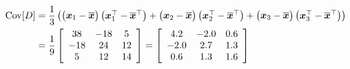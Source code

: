 \documentclass[12pt,twoside]{article}
\begin{document}
\begin{align}
    \operatorname{Cov}[D] &= \frac{1}{3} 
        \begin{pmatrix}
            \begin{pmatrix} {\boldsymbol{{x}}}_1 - \overline{{\boldsymbol{{x}}}} \end{pmatrix} 
            \begin{pmatrix} {\boldsymbol{{x}}}_1^\top - \overline{{\boldsymbol{{x}}}}^\top \end{pmatrix} +
            \begin{pmatrix} {\boldsymbol{{x}}}_2 - \overline{{\boldsymbol{{x}}}} \end{pmatrix}
            \begin{pmatrix} {\boldsymbol{{x}}}_2^\top - \overline{{\boldsymbol{{x}}}}^\top \end{pmatrix} +
            \begin{pmatrix} {\boldsymbol{{x}}}_3 - \overline{{\boldsymbol{{x}}}} \end{pmatrix}
            \begin{pmatrix} {\boldsymbol{{x}}}_3^\top - \overline{{\boldsymbol{{x}}}}^\top \end{pmatrix}
        \end{pmatrix} \\
        & = \frac{1}{9}
        \left[
        \begin{array}{ccc}
            38  & -18 &  5\\
            -18  & 24  & 12 \\
            5  & 12 & 14 
        \end{array}
        \right]
        =
        \left[
        \begin{array}{ccc}
            4.2  & -2.0 &  0.6\\
            -2.0  & 2.7  & 1.3 \\
            0.6  & 1.3 & 1.6 
        \end{array}
        \right]
\end{align}
\pagebreak{}
\end{document}
